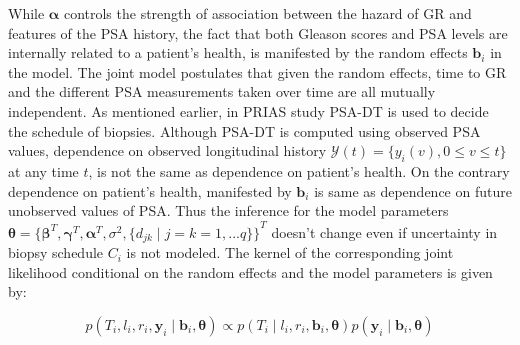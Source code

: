 While $\boldsymbol{\alpha}$ controls the strength of association between the hazard of GR and features of the PSA history, the fact that both Gleason scores and PSA levels are internally related to a patient's health, is manifested by the random effects $\boldsymbol{b}_i$ in the model. The joint model postulates that given the random effects, time to GR and the different PSA measurements taken over time are all mutually independent. As mentioned earlier, in PRIAS study PSA-DT is used to decide the schedule of biopsies. Although PSA-DT is computed using observed PSA values, dependence on observed longitudinal history $\mathcal{Y}(t) = \{y_i(v), 0\leq v \leq t\}$ at any time $t$, is not the same as dependence on patient's health. On the contrary dependence on patient's health, manifested by $\boldsymbol{b}_i$ is same as dependence on future unobserved values of PSA. Thus the inference for the model parameters $\boldsymbol{\theta} = {\{\boldsymbol{\beta}^T, \boldsymbol{\gamma}^T, \boldsymbol{\alpha}^T, \sigma^2, \{d_{jk} \mid j=k=1,...q\}\}}^T$ doesn't change even if uncertainty in biopsy schedule $C_i$ is not modeled. The kernel of the corresponding joint likelihood conditional on the random effects and the model parameters is given by:

\begin{equation*}
p(T_i, l_i, r_i, \boldsymbol{y}_i \mid \boldsymbol{b}_i, \boldsymbol{\theta}) \propto p(T_i \mid l_i, r_i, \boldsymbol{b}_i, \boldsymbol{\theta}) p(\boldsymbol{y}_i \mid \boldsymbol{b}_i, \boldsymbol{\theta})
\end{equation*}